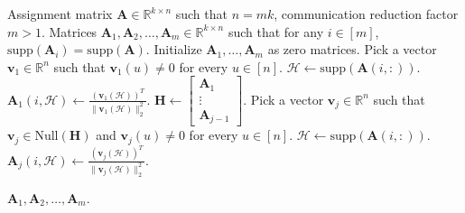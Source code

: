\documentclass[journal,draftcls,onecolumn]{IEEEtran}
\theoremstyle{mystyle}
\newcommand{\aditya}[1]{\marginpar{+}{\bf Aditya's remark}: {\em #1}}
\begin{document}
\begin{algorithm}[t!]
\caption{Algorithm to construct $\mathbf{B}$}
\label{alg:example}
\begin{algorithmic}[1] %
\REQUIRE Assignment matrix $\mathbf{A} \in \mathbb{R}^{k \times n}$ such that $n = mk$, communication reduction factor $m >1$.
\ENSURE Matrices $\mathbf{A}_1, \mathbf{A}_2, \dots, \mathbf{A}_m \in \mathbb{R}^{k \times n}$ such that for any $i \in [m]$, $\text{supp}(\mathbf{A}_i) = \text{supp}(\mathbf{A})$.
\STATE Initialize $\mathbf{A}_1, \dots, \mathbf{A}_m$ as zero matrices.  
\STATE Pick a vector $\mathbf{v}_1 \in \mathbb{R}^n$ such that $\mathbf{v}_1(u) \ne 0$ for every $u \in [n]$.
 \STATE $\mathcal{H} \gets \text{supp}(\mathbf{A}(i,:))$.
 \STATE $\mathbf{A}_1(i, \mathcal{H}) \gets \frac{(\mathbf{v}_1(\mathcal{H}))^T}{\|\mathbf{v}_1(\mathcal{H})\|_2^2}$.
\ENDFOR
{}
\STATE $\mathbf{H} \gets \begin{bmatrix} \mathbf{A}_1 \\ \vdots \\ \mathbf{A}_{j-1}\end{bmatrix}$.
\STATE Pick a vector $\mathbf{v}_j \in \mathbb{R}^n$ such that $\mathbf{v}_j \in \text{Null}(\mathbf{H})$ and $\mathbf{v}_j(u) \ne 0$ for every $u \in [n]$. 
 \STATE $\mathcal{H} \gets \text{supp}(\mathbf{A}(i,:))$.
 \STATE $\mathbf{A}_j(i, \mathcal{H}) \gets\frac{(\mathbf{v}_j(\mathcal{H}))^T}{\|\mathbf{v}_j(\mathcal{H})\|_2^2}$.
\ENDFOR
\ENDFOR

\RETURN $\mathbf{A}_1, \mathbf{A}_2, \dots, \mathbf{A}_m$.
\end{algorithmic}
\end{algorithm}
\end{document}
